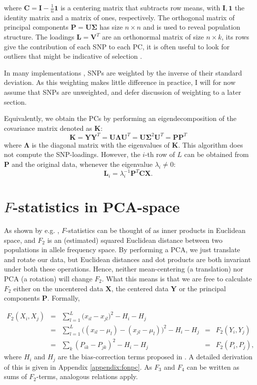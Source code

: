 \documentclass[12pt,a4pape, fullpage]{article}
\newcommand{\MX}{\mathbf{X}} %
\newcommand{\MC}{\mathbf{C}} %
\newcommand{\MY}{\mathbf{Y}} %
\newcommand{\MP}{\mathbf{P}} %
\newcommand{\ML}{\mathbf{L}} %
\newcommand{\MK}{\mathbf{K}} %
\newcommand{\MSINGULAR}{\mathbf{\Sigma}} %
\newcommand{\MEIGEN}{\mathbf{\Lambda}} %
\begin{document}
	where $\MC = \mathbf{I} -\frac{1}{n}\mathbf{1}$ is a centering matrix that subtracts row means, with $\mathbf{I}, \mathbf{1}$  the identity matrix and a matrix of ones, respectively. The orthogonal matrix of principal components $\MP=\mathbf{U}\MSINGULAR$ has size $n \times n$ and is used to reveal population structure. The loadings $\ML=\mathbf{V}^T$ are an orthonormal matrix of size $n \times k$, its rows give the contribution of each SNP to each PC, it is often useful to look for outliers that might be indicative of selection \cite[e.g][]{francois2010}.
	
	In many  implementations \citep[e.g]{patterson2006}, SNPs are weighted by the inverse of their standard deviation. As this weighting makes little difference in practice, I will for now assume that SNPs are unweighted, and defer discussion of weighting to a later section.
	
	Equivalently, we obtain the PCs by performing an eigendecomposition of the  covariance matrix denoted as $\MK$:
	 \begin{equation}
 \MK = \MY \MY^T = \mathbf{U}\MEIGEN\mathbf{U}^T = \mathbf{U}\MSINGULAR^2\mathbf{U}^T =\MP\MP^T
	\end{equation} where $\MEIGEN$ is the diagonal matrix with the eigenvalues of $\MK$. 
	This algorithm does not compute the SNP-loadings. However, the $i$-th row of $L$  can be obtained from $\MP$ and the original data, whenever the eigenvalue $\lambda_i \neq 0$:
	\begin{equation}
	\ML_i = \lambda_i^{-1}\MP^T\MC\MX \text{.}
	\end{equation}
	



\section{$F$-statistics in PCA-space}
As shown by e.g. \cite{oteo-garcia2021}, $F$-statistics can be thought of as inner products in Euclidean space, and $F_2$ is an (estimated) squared Euclidean distance between two populations in allele frequency space. By performing a PCA, we just translate and rotate our data, but Euclidean distances and dot products are both invariant under both these operations. Hence, neither mean-centering (a translation) nor PCA (a rotation) will change $F_2$. What this means is that we are free to calculate $F_2$ either on the uncentered data $\MX$, the centered data $\MY$ or the principal components $\MP$. Formally,

\begin{align}
F_2(X_i, X_j) &=&  \sum_{l=1}^L \big( x_{il} -x_{jl}\big)^2 - H_i - H_j &&\nonumber\\ 
 &=& \sum_{l=1}^L \big( (x_{il} - \mu_l) -(x_{jl} -\mu_l)\big)^2 - H_i - H_j  &=& F_2(Y_i, Y_j) \nonumber\\
 &=& \sum_k (P_{ik} - P_{jk})^2 - H_i - H_j &=& F_2(P_i, P_j) \text{,}
\end{align}
where $H_i$ and $H_j$ are the bias-correction terms proposed in \cite{reich2009}. A detailed derivation of this is given in Appendix \ref{appendix:fonpc}.
As $F_3$ and $F_4$ can be written as sums of $F_2$-terms, analogous relations apply.
\end{document}
